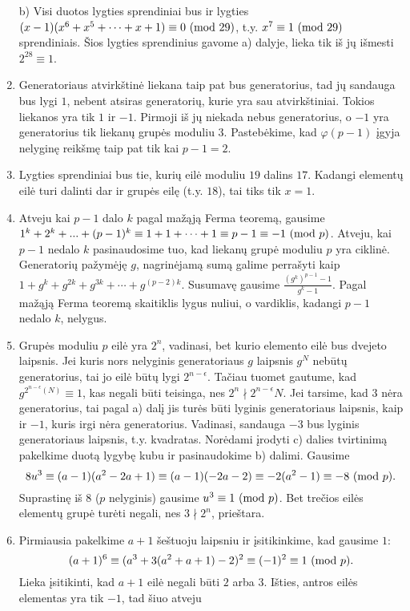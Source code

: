 \begin{enumerate}
b) Visi duotos lygties sprendiniai bus ir lygties $(x-1)(x^6 + x^5 +
\dots + x + 1) \equiv 0 \ (\text{mod } 29)$, t.y. $x^7 \equiv 1 \ (\text{mod } 29)$
sprendiniais. Šios lygties sprendinius gavome a) dalyje, lieka tik iš
jų išmesti $2^{28} \equiv 1$.
\item 
Generatoriaus atvirkštinė liekana taip pat bus generatorius, tad jų
sandauga bus lygi $1$, nebent atsiras generatorių, kurie yra sau
atvirkštiniai. Tokios liekanos yra tik $1$ ir $-1$. Pirmoji iš jų
niekada nebus generatorius, o $-1$ yra generatorius tik liekanų grupės
moduliu $3$. Pastebėkime, kad $\varphi(p-1)$ įgyja nelyginę reikšmę
taip pat tik kai $p-1 = 2$.
\item 
Lygties sprendiniai bus tie, kurių eilė moduliu $19$ dalins $17$.
Kadangi elementų eilė turi dalinti dar ir grupės eilę (t.y. $18$), tai
tiks tik $x=1$.
\item 
Atveju kai $p-1$ dalo $k$ pagal mažąją Ferma teoremą, gausime $1^k + 2^k +
... + (p-1)^k \equiv 1 + 1 + \cdots + 1 \equiv p-1 \equiv -1 \ (\text{mod } p)$.
Atveju, kai $p-1$ nedalo $k$ pasinaudosime tuo, kad liekanų grupė
moduliu $p$ yra ciklinė. Generatorių pažymėję $g$, nagrinėjamą sumą
galime perrašyti kaip $1 + g^k + g^{2k} + g^{3k} + \cdots +
g^{(p-2)k}$. Susumavę gausime $\frac{(g^k)^{p-1} - 1}{g^k - 1}$. Pagal
mažąją Ferma teoremą skaitiklis lygus nuliui, o vardiklis, kadangi
$p-1$ nedalo $k$, nelygus.
\item 
Grupės moduliu $p$ eilė yra $2^n$, vadinasi, bet kurio elemento eilė
bus dvejeto laipsnis. Jei kuris nors nelyginis generatoriaus
$g$ laipsnis $g^N$ nebūtų generatorius, tai jo eilė būtų lygi
$2^{n-\epsilon}$. Tačiau tuomet gautume, kad
$g^{2^{n-\epsilon}(N)} \equiv 1$, kas negali būti teisinga, nes
$2^n \nmid 2^{n-\epsilon}N$. Jei tarsime, kad $3$ nėra generatorius,
tai pagal a) dalį jis turės būti lyginis generatoriaus laipsnis, kaip
ir $-1$, kuris irgi nėra generatorius. Vadinasi, sandauga $-3$ bus
lyginis generatoriaus laipsnis, t.y. kvadratas. Norėdami įrodyti c)
dalies tvirtinimą pakelkime duotą lygybę kubu ir pasinaudokime b)
dalimi. Gausime $$8u^3 \equiv (a-1)(a^2-2a+1) \equiv (a-1)(-2a -2)
\equiv -2(a^2-1) \equiv -8 \ (\text{mod } p).$$ Suprastinę iš $8$ ($p$ nelyginis)
gausime $u^3 \equiv 1 \ (\text{mod } p)$. Bet trečios eilės elementų grupė turėti
negali, nes $3 \nmid 2^n$, prieštara.
\item 
Pirmiausia pakelkime $a+1$ šeštuoju laipsniu ir įsitikinkime, kad gausime
$1$: $$(a+1)^6 \equiv (a^3 + 3(a^2 + a + 1) -2)^2 \equiv (-1)^2 \equiv
1\ (\text{mod } p).$$ Lieka įsitikinti, kad $a+1$ eilė negali būti $2$ arba
$3$. Išties, antros eilės elementas yra tik $-1$, tad šiuo atveju

\end{enumerate}
